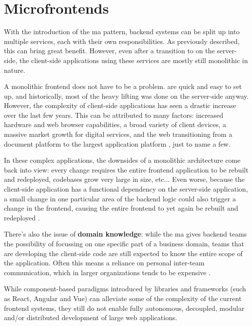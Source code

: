\section{Microfrontends}

With the introduction of the \gls{ma} pattern, \gls{backend} systems can be
split up into multiple services, each with their own responsibilities. As
previously described, this can bring great benefit. However, even after a
transition to  on the server-side, the client-side
applications using these services are mostly still \gls{monolithic} in nature.

A \gls{monolithic} \gls{frontend} does not have to be a problem.
 are quick and easy to set up, and historically, most of the
heavy lifting was done on the server-side anyway. However, the complexity of
client-side applications has seen a drastic increase over the last few years.
This can be attributed to many factors: increased hardware and web browser
capabilities, a broad variety of client devices, a massive market growth for
digital services, and the web transitioning from a document platform to the
largest application platform \autocite{Ball_2019}, just to name a few.

In these complex applications, the downsides of a \gls{monolithic} architecture
come back into view: every change requires the entire \gls{frontend} application
to be rebuilt and redeployed, codebases grow very large in size, etc... Even
worse, because the client-side application has a functional dependency on the
server-side application, a small change in one particular area of the
\gls{backend} logic could also trigger a change in the \gls{frontend}, causing
the entire \gls{frontend} to yet again be rebuilt and redeployed
\autocite{Rappl_LogRocket_2019}.

There's also the issue of \textbf{domain knowledge}: while the \gls{ma} gives
\gls{backend} teams the possibility of focussing on one specific part of a
business domain, teams that are developing the client-side code are still
expected to know the entire scope of the application. Often this means a
reliance on personal inter-team communication, which in larger organizations
tends to be expensive \autocite{Geers_2020}. 

While component-based paradigms introduced by libraries and frameworks (such as
React,
Angular and
Vue) can alleviate some of the complexity of the
current frontend systems, they still do not enable  fully autonomous, decoupled,
modular and/or distributed development of large web applications.

